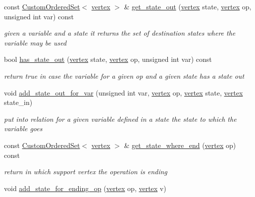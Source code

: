 \begin{DoxyCompactItemize}
const \hyperlink{classCustomOrderedSet}{Custom\+Ordered\+Set}$<$ \hyperlink{graph_8hpp_abefdcf0544e601805af44eca032cca14}{vertex} $>$ \& \hyperlink{classliveness_acba3b65c03d0608cec1c4c1d5ed79aa6}{get\+\_\+state\+\_\+out} (\hyperlink{graph_8hpp_abefdcf0544e601805af44eca032cca14}{vertex} state, \hyperlink{graph_8hpp_abefdcf0544e601805af44eca032cca14}{vertex} op, unsigned int var) const
\begin{DoxyCompactList}\small\item\em given a variable and a state it returns the set of destination states where the variable may be used \end{DoxyCompactList}\item 
bool \hyperlink{classliveness_ae480c818873afd9cc880d52cdfeeadbc}{has\+\_\+state\+\_\+out} (\hyperlink{graph_8hpp_abefdcf0544e601805af44eca032cca14}{vertex} state, \hyperlink{graph_8hpp_abefdcf0544e601805af44eca032cca14}{vertex} op, unsigned int var) const
\begin{DoxyCompactList}\small\item\em return true in case the variable for a given op and a given state has a state out \end{DoxyCompactList}\item 
void \hyperlink{classliveness_acbd0bee3638baf3bbafd2adef1415810}{add\+\_\+state\+\_\+out\+\_\+for\+\_\+var} (unsigned int var, \hyperlink{graph_8hpp_abefdcf0544e601805af44eca032cca14}{vertex} op, \hyperlink{graph_8hpp_abefdcf0544e601805af44eca032cca14}{vertex} state, \hyperlink{graph_8hpp_abefdcf0544e601805af44eca032cca14}{vertex} state\+\_\+in)
\begin{DoxyCompactList}\small\item\em put into relation for a given variable defined in a state the state to which the variable goes \end{DoxyCompactList}\item 
const \hyperlink{classCustomOrderedSet}{Custom\+Ordered\+Set}$<$ \hyperlink{graph_8hpp_abefdcf0544e601805af44eca032cca14}{vertex} $>$ \& \hyperlink{classliveness_aa84cc94d53f30327900a326f38c8d64c}{get\+\_\+state\+\_\+where\+\_\+end} (\hyperlink{graph_8hpp_abefdcf0544e601805af44eca032cca14}{vertex} op) const
\begin{DoxyCompactList}\small\item\em return in which support vertex the operation is ending \end{DoxyCompactList}\item 
void \hyperlink{classliveness_a288fca9d3983f844e29898fcf401890a}{add\+\_\+state\+\_\+for\+\_\+ending\+\_\+op} (\hyperlink{graph_8hpp_abefdcf0544e601805af44eca032cca14}{vertex} op, \hyperlink{graph_8hpp_abefdcf0544e601805af44eca032cca14}{vertex} v)

\end{DoxyCompactItemize}
